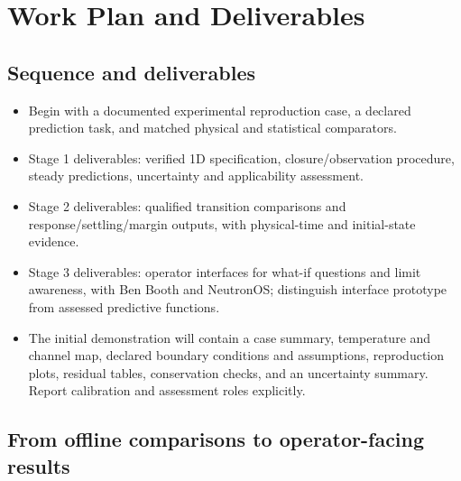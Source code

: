 \section{Work Plan and Deliverables}\label{sec:work-plan-and-deliverables}

\subsection{Sequence and deliverables}\label{subsec:sequence-and-deliverables}

\begin{itemize}[leftmargin=*]
\item Begin with a documented experimental reproduction case, a declared prediction task, and matched physical and statistical comparators.
\item Stage 1 deliverables: verified 1D specification, closure/\allowbreak{}observation procedure, steady predictions, uncertainty and applicability assessment.
\item Stage 2 deliverables: qualified transition comparisons and response/\allowbreak{}settling/\allowbreak{}margin outputs, with physical-time and initial-state evidence.
\item Stage 3 deliverables: operator interfaces for what-if questions and limit awareness, with Ben Booth and NeutronOS; distinguish interface prototype from assessed predictive functions.
\item The initial demonstration will contain a case summary, temperature and channel map, declared boundary conditions and assumptions, reproduction plots, residual tables, conservation checks, and an uncertainty summary. Report calibration and assessment roles explicitly.
\end{itemize}

\subsection{From offline comparisons to operator-facing results}\label{subsec:from-offline-comparisons-to-operator-facing-results}

